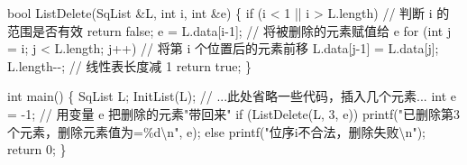 \documentclass[10.5pt,a4paper,oneside]{article}
\newenvironment{Shaded}{}{}
\newcommand{\CommentTok}[1]{\textcolor[rgb]{0.18,0.55,0.23}{#1}}
\newcommand{\ControlFlowTok}[1]{\textcolor[rgb]{0.12,0.31,0.71}{#1}}
\newcommand{\DataTypeTok}[1]{\textcolor[rgb]{0.12,0.31,0.71}{#1}}
\newcommand{\DecValTok}[1]{\textcolor[rgb]{0.77,0.35,0.07}{#1}}
\newcommand{\KeywordTok}[1]{\textcolor[rgb]{0.12,0.31,0.71}{#1}}
\newcommand{\NormalTok}[1]{#1}
\newcommand{\OperatorTok}[1]{\textcolor[rgb]{0.20,0.20,0.20}{#1}}
\newcommand{\SpecialCharTok}[1]{\textcolor[rgb]{0.63,0.19,0.43}{#1}}
\newcommand{\StringTok}[1]{\textcolor[rgb]{0.63,0.19,0.43}{#1}}
\begin{document}
\begin{Shaded}
\begin{Highlighting}[]
\DataTypeTok{bool}\NormalTok{ ListDelete}\OperatorTok{(}\NormalTok{SqList }\OperatorTok{\&}\NormalTok{L}\OperatorTok{,} \DataTypeTok{int}\NormalTok{ i}\OperatorTok{,} \DataTypeTok{int} \OperatorTok{\&}\NormalTok{e}\OperatorTok{)} \OperatorTok{\{}
    \ControlFlowTok{if} \OperatorTok{(}\NormalTok{i }\OperatorTok{\textless{}} \DecValTok{1} \OperatorTok{||}\NormalTok{ i }\OperatorTok{\textgreater{}}\NormalTok{ L}\OperatorTok{.}\NormalTok{length}\OperatorTok{)}         \CommentTok{// 判断 i 的范围是否有效}
        \ControlFlowTok{return} \KeywordTok{false}\OperatorTok{;}
\NormalTok{    e }\OperatorTok{=}\NormalTok{ L}\OperatorTok{.}\NormalTok{data}\OperatorTok{[}\NormalTok{i}\OperatorTok{{-}}\DecValTok{1}\OperatorTok{];}                   \CommentTok{// 将被删除的元素赋值给 e}
    \ControlFlowTok{for} \OperatorTok{(}\DataTypeTok{int}\NormalTok{ j }\OperatorTok{=}\NormalTok{ i}\OperatorTok{;}\NormalTok{ j }\OperatorTok{\textless{}}\NormalTok{ L}\OperatorTok{.}\NormalTok{length}\OperatorTok{;}\NormalTok{ j}\OperatorTok{++)} \CommentTok{// 将第 i 个位置后的元素前移}
\NormalTok{        L}\OperatorTok{.}\NormalTok{data}\OperatorTok{[}\NormalTok{j}\OperatorTok{{-}}\DecValTok{1}\OperatorTok{]} \OperatorTok{=}\NormalTok{ L}\OperatorTok{.}\NormalTok{data}\OperatorTok{[}\NormalTok{j}\OperatorTok{];}
\NormalTok{    L}\OperatorTok{.}\NormalTok{length}\OperatorTok{{-}{-};}                        \CommentTok{// 线性表长度减 1}
    \ControlFlowTok{return} \KeywordTok{true}\OperatorTok{;}
\OperatorTok{\}}

\DataTypeTok{int}\NormalTok{ main}\OperatorTok{()} \OperatorTok{\{}
\NormalTok{    SqList L}\OperatorTok{;}
\NormalTok{    InitList}\OperatorTok{(}\NormalTok{L}\OperatorTok{);}
    \CommentTok{// ...此处省略一些代码，插入几个元素...}
    \DataTypeTok{int}\NormalTok{ e }\OperatorTok{=} \OperatorTok{{-}}\DecValTok{1}\OperatorTok{;}                        \CommentTok{// 用变量 e 把删除的元素"带回来"}
    \ControlFlowTok{if} \OperatorTok{(}\NormalTok{ListDelete}\OperatorTok{(}\NormalTok{L}\OperatorTok{,} \DecValTok{3}\OperatorTok{,}\NormalTok{ e}\OperatorTok{))}
\NormalTok{        printf}\OperatorTok{(}\StringTok{"已删除第3个元素，删除元素值为=}\SpecialCharTok{\%d\textbackslash{}n}\StringTok{"}\OperatorTok{,}\NormalTok{ e}\OperatorTok{);}
    \ControlFlowTok{else}
\NormalTok{        printf}\OperatorTok{(}\StringTok{"位序i不合法，删除失败}\SpecialCharTok{\textbackslash{}n}\StringTok{"}\OperatorTok{);}
    \ControlFlowTok{return} \DecValTok{0}\OperatorTok{;}
\OperatorTok{\}}
\end{Highlighting}
\end{Shaded}
\end{document}
